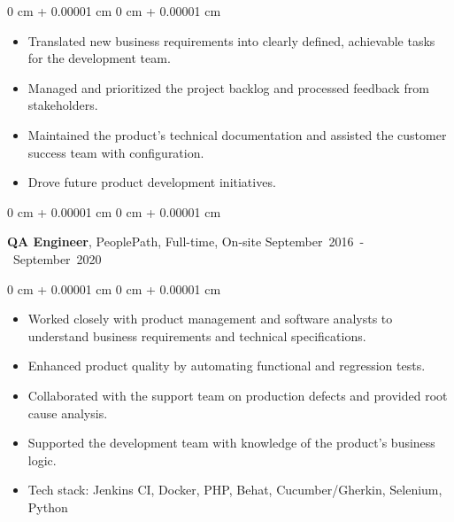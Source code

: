 \documentclass[10pt, a4paper]{article}
\newenvironment{highlights}{
    \begin{itemize}[
        topsep=0.05 cm,
        parsep=0.05 cm,
        partopsep=0pt,
        itemsep=0pt,
        leftmargin=0 cm + 10pt
    ]
}{
    \end{itemize}
} %
\newenvironment{onecolentry}{
    \begin{adjustwidth}{
        0 cm + 0.00001 cm
    }{
        0 cm + 0.00001 cm
    }
}{
    \end{adjustwidth}
} %
\newenvironment{twocolentry}[2][]{
    \onecolentry
    \def\secondColumn{#2}
    \setcolumnwidth{\fill, 4.5 cm}
    \begin{paracol}{2}
}{
    \switchcolumn \raggedleft \secondColumn
    \end{paracol}
    \endonecolentry
} %
\begin{document}
        \vspace{0.10 cm}
        \begin{onecolentry}
            \begin{highlights}
                \item Translated new business requirements into clearly defined, achievable tasks for the development team.
                \item Managed and prioritized the project backlog and processed feedback from stakeholders.
                \item Maintained the product's technical documentation and assisted the customer success team with configuration.
                \item Drove future product development initiatives.
            \end{highlights}
        \end{onecolentry}

        \vspace{0.5 cm}

        \begin{twocolentry}{
            \small\mbox{September 2016 - September 2020}
        }
            \textbf{QA Engineer}, PeoplePath, Full-time, On-site\end{twocolentry}

        \vspace{0.10 cm}
        \begin{onecolentry}
            \begin{highlights}
                \item Worked closely with product management and software analysts to understand business requirements and technical specifications.
                \item Enhanced product quality by automating functional and regression tests.
                \item Collaborated with the support team on production defects and provided root cause analysis.
                \item Supported the development team with knowledge of the product's business logic.
                \item Tech stack: Jenkins CI, Docker, PHP, Behat, Cucumber/Gherkin, Selenium, Python
            \end{highlights}
        \end{onecolentry}

    \vspace{0.2 cm}
\end{document}

